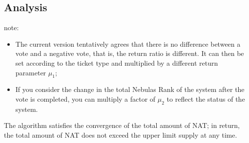 \subsection{Analysis}

note:
\begin{itemize}
\item The current version tentatively agrees that there is no difference between a vote and a negative vote, that is, the return ratio is different. It can then be set according to the ticket type and multiplied by a different return parameter $\mu_1$;
\item If you consider the change in the total Nebulas Rank of the system after the vote is completed, you can multiply a factor of $\mu_2$ to reflect the status of the system.
\end{itemize}

\begin{property}
	The algorithm satisfies the convergence of the total amount of NAT; in return, the total amount of NAT does not exceed the upper limit supply at any time.
\end{property}

